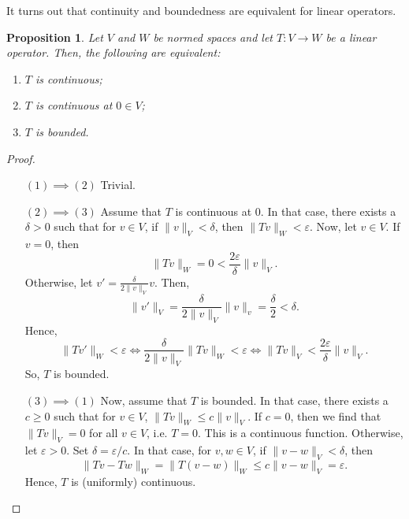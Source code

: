 \documentclass[a4paper, openany]{memoir}
\theoremstyle{definition}
\theoremstyle{plain}
\newtheorem{proposition}[definition]{Proposition}
\begin{document}
    It turns out that continuity and boundedness are equivalent for linear operators.
    \begin{proposition}
        Let $V$ and $W$ be normed spaces and let $T \colon V \to W$ be a linear operator. Then, the following are equivalent:
        \begin{enumerate}
            \item $T$ is continuous;
            \item $T$ is continuous at $0 \in V$;
            \item $T$ is bounded.
        \end{enumerate}
    \end{proposition}
    \begin{proof}
        \hspace*{0pt}
        \begin{itemize}
            \item[$(1) \implies (2)$] Trivial.
            
            \item[$(2) \implies (3)$] Assume that $T$ is continuous at $0$. In that case, there exists a $\delta > 0$ such that for $v \in V$, if $\lVert v \rVert_V < \delta$, then $\lVert Tv \rVert_W < \varepsilon$. Now, let $v \in V$. If $v = 0$, then 
            \[\lVert Tv \rVert_W = 0 < \frac{2 \varepsilon}{\delta} \lVert v \rVert_V.\]
            Otherwise, let $v' = \frac{\delta}{2 \lVert v \rVert_V} v$. Then,
            \[\lVert v' \rVert_V = \frac{\delta}{2 \lVert v \rVert_V} \lVert v \rVert_v = \frac{\delta}{2} < \delta.\]
            Hence,
            \[\lVert Tv' \rVert_W < \varepsilon \iff \frac{\delta}{2 \lVert v \rVert_V} \lVert Tv \rVert_W < \varepsilon \iff \lVert Tv \rVert_V < \frac{2\varepsilon}{\delta} \lVert v \rVert_V.\]
            So, $T$ is bounded.
            
            \item[$(3) \implies (1)$] Now, assume that $T$ is bounded. In that case, there exists a $c \geq 0$ such that for $v \in V$, $\lVert Tv \rVert_W \leq c \lVert v \rVert_V$. If $c = 0$, then we find that $\lVert Tv \rVert_V = 0$ for all $v \in V$, i.e. $T = 0$. This is a continuous function. Otherwise, let $\varepsilon > 0$. Set $\delta = \varepsilon/c$. In that case, for $v, w \in V$, if $\lVert v - w \rVert_V < \delta$, then 
            \[\lVert Tv - Tw \rVert_W = \lVert T(v - w) \rVert_W \leq c \lVert v - w \rVert_V = \varepsilon.\]
            Hence, $T$ is (uniformly) continuous.
        \end{itemize}
    \end{proof}
\end{document}
